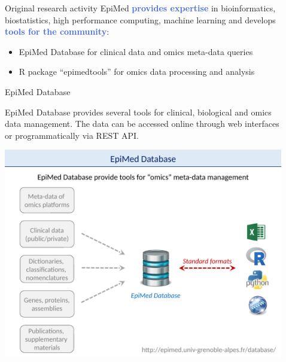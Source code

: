 \documentclass[final]{beamer}
\newlength{\sepwid}
\newlength{\twocolwid}
\begin{document}
\begin{frame}[t]
\begin{columns}[t]
\begin{column}{\twocolwid}
\begin{block}{Original research activity}
EpiMed \textcolor{RoyalBlue}{\textbf{provides expertise}} in bioinformatics, biostatistics, high performance computing, machine learning and develops \textcolor{RoyalBlue}{\textbf{tools for the community}}:
\begin{itemize}
\item EpiMed Database for clinical data and omics meta-data queries
\item R package “epimedtools” for omics data processing and analysis
\end{itemize}

\end{block}


\begin{block}{EpiMed Database}

EpiMed Database provides several tools for clinical, biological and omics data management. The data can be accessed online through web interfaces or programmatically via REST API.

{
\centering
\mbox{\includegraphics[trim = 0mm 0mm 0mm 30mm, clip, width=\linewidth]{figs/fig03}}

}


\end{block}

\end{column} 

\begin{column}{\sepwid}\end{column} %

\begin{column}{\twocolwid} %





\end{column}
\end{columns}
\end{frame}
\end{document}
